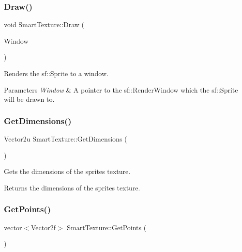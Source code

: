 \subsubsection{\texorpdfstring{Draw()}{Draw()}}
{\footnotesize\ttfamily void Smart\+Texture\+::\+Draw (\begin{DoxyParamCaption}\item[{Render\+Window $\ast$}]{Window }\end{DoxyParamCaption})\hspace{0.3cm}{\ttfamily [inline]}}



Renders the sf\+::\+Sprite to a window. 


\begin{DoxyParams}{Parameters}
{\em Window} & A pointer to the sf\+::\+Render\+Window which the sf\+::\+Sprite will be drawn to.\\
\hline
\end{DoxyParams}
\mbox{\label{struct_smart_texture_a18d5089ac0e730deb87bda09377f5402}} 
\subsubsection{\texorpdfstring{Get\+Dimensions()}{GetDimensions()}}
{\footnotesize\ttfamily Vector2u Smart\+Texture\+::\+Get\+Dimensions (\begin{DoxyParamCaption}{ }\end{DoxyParamCaption})\hspace{0.3cm}{\ttfamily [inline]}}



Gets the dimensions of the sprites texture. 

\begin{DoxyReturn}{Returns}
the dimensions of the sprites texture.
\end{DoxyReturn}
\mbox{\label{struct_smart_texture_a38430739f5dce9ba11b9d91395ba4e30}} 
\subsubsection{\texorpdfstring{Get\+Points()}{GetPoints()}}
{\footnotesize\ttfamily vector$<$Vector2f$>$ Smart\+Texture\+::\+Get\+Points (\begin{DoxyParamCaption}{ }\end{DoxyParamCaption})\hspace{0.3cm}{\ttfamily [inline]}}



